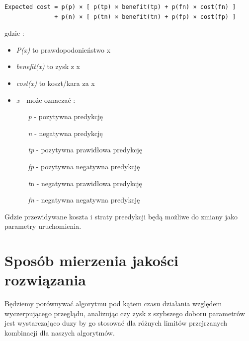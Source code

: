 \documentclass[11pt]{article}
\begin{document}
\begin{verbatim}
Expected cost = p(p) × [ p(tp) × benefit(tp) + p(fn) × cost(fn) ]
              + p(n) × [ p(tn) × benefit(tn) + p(fp) × cost(fp) ]
\end{verbatim}           
gdzie :
\begin{itemize}
	\item \textsl{P(x)} to prawdopodonieństwo x
	\item \textsl{benefit(x)} to zysk z x
	\item \textsl{cost(x)} to koszt/kara za x
	\item \textsl{x} - może oznaczać :
		\begin{itemize}
			\item[\textit{p} -] pozytywna predykcję
			\item[\textit{n} -] negatywna predykcję
			\item[\textit{tp} -] pozytywna prawidłowa predykcję
			\item[\textit{fp} -] pozytywna negatywna predykcję
			\item[\textit{t}n -] negatywna prawidłowa predykcję
			\item[\textit{fn} -] negatywna negatywna predykcję
		\end{itemize}
\end{itemize}
Gdzie przewidywane koszta i straty preedykcji będą możliwe do zmiany jako parametry uruchomienia.

\section{Sposób mierzenia jakości rozwiązania}
Będziemy porównywać algorytmu pod kątem czasu działania względem wyczerpującego przeglądu, analizując czy zysk z szybszego doboru parametrów jest wystarczająco duzy by go stosować dla różnych limitów przejrzanych kombinacji dla naszych algorytmów.
\end{document}

